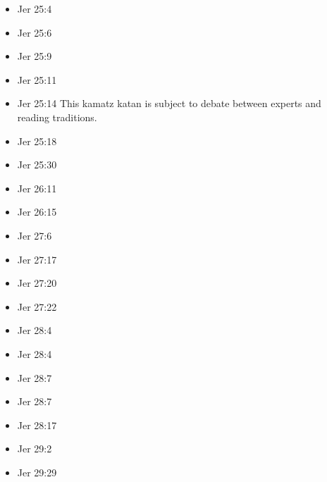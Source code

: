 \documentclass[14pt]{book}
\begin{document}
\begin{multicols}{2}
\begin{itemize}
						\item Jer 25:4
						
						\item Jer 25:6
						
						\item Jer 25:9
						
						\item Jer 25:11
						
						\item Jer 25:14 This kamatz katan is subject to debate between experts and reading traditions.
						
						\item Jer 25:18
						
						\item Jer 25:30
						
						\item Jer 26:11
						
						\item Jer 26:15
						
						\item Jer 27:6
						
						\item Jer 27:17
						
						\item Jer 27:20
						
						\item Jer 27:22
						
						\item Jer 28:4
						
						\item Jer 28:4
						
						\item Jer 28:7
						
						\item Jer 28:7
						
						\item Jer 28:17
						
						\item Jer 29:2
						
								
								\item Jer 29:29
								

\end{itemize}
\end{multicols}
\end{document}
